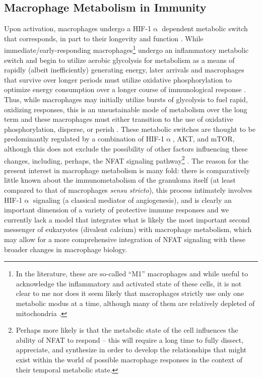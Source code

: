 \subsection{Macrophage Metabolism in Immunity}\label{metabolism}

Upon activation, macrophages undergo a HIF\hyp{}1$\upalpha$ dependent metabolic switch that corresponds, in part to their longevity and function \citep{Kolliniati2022}. While immediate/early\hyp{}responding macrophages\footnote{In the literature, these are so\hyp{}called ``M1'' macrophages and while useful to acknowledge the inflammatory and activated state of these cells, it is not clear to me nor does it seem likely that macrophages strictly use only one metabolic modus at a time, although many of them are relatively depleted of mitochondria \citep{Biswas2012}.} undergo an inflammatory metabolic switch and begin to utilize aerobic glycolysis for metabolism as a means of rapidly (albeit inefficiently) generating energy, later arrivals and macrophages that survive over longer periods must utilize oxidative phosphorylation to optimize energy consumption over a longer course of immunological response \citep{Kiran2016, Langston2017, Shi2019, Viola2019, Taylor2022}. Thus, while macrophages may initially utilize  bursts of glycolysis to fuel rapid, oxidizing responses, this is an unsustainable mode of metabolism over the long term and these macrophages must either transition to the use of oxidative phosphorylation, disperse, or perish \citep{Odegaard2011, Howard2020}. These metabolic switches are thought to be predominantly regulated by a combination of HIF\hyp{}1$\upalpha$, AKT, and mTOR, although this does not exclude the possibility of other factors influencing these changes, including, perhaps, the NFAT signaling pathway\footnote{Perhaps more likely is that the metabolic state of the cell influences the ability of NFAT to respond -- this will require a long time to fully dissect, appreciate, and synthesize in order to develop the relationships that might exist within the world of possible macrophage responses in the context of their temporal metabolic state.} \citep{Karar2011, Covarrubias2015}. The reason for the present interest in macrophage metabolism is many fold: there is comparatively little known about the immunometabolism of the granuloma itself (at least compared to that of macrophages \textit{sensu stricto}), this process intimately involves HIF\hyp{}1$\upalpha$ signaling (a classical mediator of angiogenesis), and is clearly an important dimension of a variety of protective immune responses and we currently lack a model that integrates what is likely the most important second messenger of eukaryotes (divalent calcium) with macrophage metabolism, which may allow for a more comprehensive integration of NFAT signaling with these broader changes in macrophage biology. 

